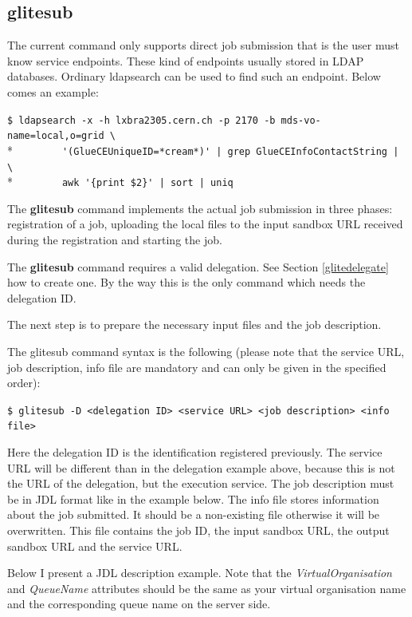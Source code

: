 \documentclass{article}
\begin{document}
\subsection{glitesub}
\label{glitesub}
The current command only supports direct job submission that is the user must know service endpoints. These kind of endpoints usually stored in LDAP databases. Ordinary ldapsearch can be used to find such an endpoint. Below comes an example:\par
\begin{shaded}
\verb#$ ldapsearch -x -h lxbra2305.cern.ch -p 2170 -b mds-vo-name=local,o=grid \#\\*
\verb#        '(GlueCEUniqueID=*cream*)' | grep GlueCEInfoContactString | \#\\*
\verb#        awk '{print $2}' | sort | uniq#
\end{shaded}
The \textbf{glitesub} command implements the actual job submission in three phases: registration of a job, uploading the local files to the input sandbox URL received during the registration and starting the job.\par
The \textbf{glitesub} command requires a valid delegation. See Section \ref{glitedelegate} how to create one. By the way this is the only command which needs the delegation ID.\par The next step is to prepare the necessary input files and the job description.\par
The glitesub command syntax is the following (please note that the service URL, job description, info file are mandatory and can only be given in the specified order):
\begin{shaded}\verb#$ glitesub -D <delegation ID> <service URL> <job description> <info file>#\end{shaded}
Here the delegation ID is the identification registered previously. The service URL will be different than in the delegation example above, because this is not the URL of the delegation, but the execution service. The job description must be in JDL format like in the example below. The info file stores information about the job submitted. It should be a non-existing file otherwise it will be overwritten. This file contains the job ID, the input sandbox URL, the output sandbox URL and the service URL.\par
Below I present a JDL description example. Note that the \textit{VirtualOrganisation} and \textit{QueueName} attributes should be the same as your virtual organisation name and the corresponding queue name on the server side.\par
\end{document}
